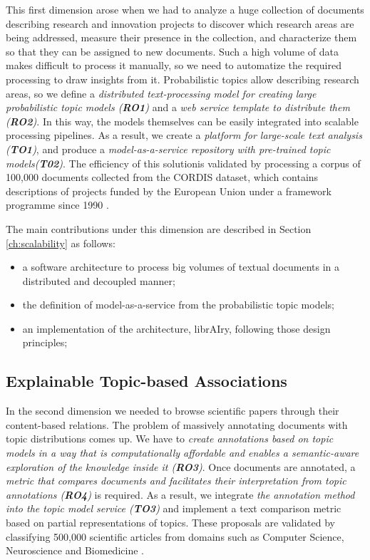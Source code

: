 This first dimension arose when we had to analyze a huge collection of documents describing research and innovation projects to discover which research areas are being addressed, measure their presence in the collection, and characterize them so that they can be assigned to new documents. Such a high volume of data makes difficult to process it manually, so we need to automatize the required processing to draw insights from it. Probabilistic topics allow describing research areas, so we define a \textit{distributed text-processing model for creating large probabilistic topic models (\textbf{RO1})} and a \textit{web service template to distribute them (\textbf{RO2})}. In this way, the models themselves can be easily integrated into scalable processing pipelines. As a result, we create a \textit{platform for large-scale text analysis (\textbf{TO1})}, and produce a \textit{model-as-a-service repository with pre-trained topic models(\textbf{T02})}. The efficiency of this solutionis validated by processing a corpus of 100,000 documents collected from the CORDIS dataset, which contains descriptions of projects funded by the European Union under a framework programme since 1990 \citep{Badenes-Olmedo2017}. 

The main contributions under this dimension are described in Section \ref{ch:scalability} as follows:
\begin{itemize}
\item a software architecture to process big volumes of textual documents in a distributed and decoupled manner;
\item the definition of model-as-a-service from the probabilistic topic models;
\item an implementation of the architecture, librAIry, following those design principles;
\end{itemize} 


\subsection{Explainable Topic-based Associations}

In the second dimension we needed to browse scientific papers through their content-based relations. The problem of massively annotating documents with topic distributions comes up. We have to \textit{create annotations based on topic models in a way that is computationally affordable and enables a semantic-aware exploration of the knowledge inside it (\textbf{RO3})}. Once documents are annotated, a \textit{metric that compares documents and facilitates their interpretation from topic annotations (\textbf{RO4})} is required. As a result, we integrate \textit{the annotation method into the topic model service (\textbf{TO3})} and implement a text comparison metric based on partial representations of topics. These proposals are validated by classifying 500,000 scientific articles from domains such as Computer Science, Neuroscience and Biomedicine \citep{Badenes-Olmedo2017b} \citep{Badenes-Olmedo2017c} \citep{Badenes-Olmedo2019b}. 

